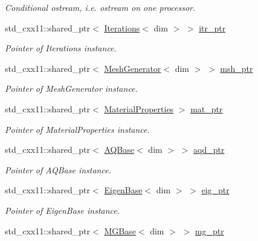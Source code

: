 \begin{DoxyCompactItemize}
\begin{DoxyCompactList}\small\item\em Conditional ostream, i.\+e. ostream on one processor. \end{DoxyCompactList}\item 
std\+\_\+cxx11\+::shared\+\_\+ptr$<$ \hyperlink{class_iterations}{Iterations}$<$ dim $>$ $>$ \hyperlink{class_bart_driver_ae07e7a592dd255d69685f17d98a2ecc6}{itr\+\_\+ptr}
\begin{DoxyCompactList}\small\item\em Pointer of Iterations instance. \end{DoxyCompactList}\item 
std\+\_\+cxx11\+::shared\+\_\+ptr$<$ \hyperlink{class_mesh_generator}{Mesh\+Generator}$<$ dim $>$ $>$ \hyperlink{class_bart_driver_a976c3ba1c98180dced85019dfd56e225}{msh\+\_\+ptr}
\begin{DoxyCompactList}\small\item\em Pointer of Mesh\+Generator instance. \end{DoxyCompactList}\item 
std\+\_\+cxx11\+::shared\+\_\+ptr$<$ \hyperlink{class_material_properties}{Material\+Properties} $>$ \hyperlink{class_bart_driver_aef9abac579c212463a6790a0e39e6429}{mat\+\_\+ptr}
\begin{DoxyCompactList}\small\item\em Pointer of Material\+Properties instance. \end{DoxyCompactList}\item 
std\+\_\+cxx11\+::shared\+\_\+ptr$<$ \hyperlink{class_a_q_base}{A\+Q\+Base}$<$ dim $>$ $>$ \hyperlink{class_bart_driver_a818149e4acfe5a7108ef42938650ff11}{aqd\+\_\+ptr}
\begin{DoxyCompactList}\small\item\em Pointer of A\+Q\+Base instance. \end{DoxyCompactList}\item 
std\+\_\+cxx11\+::shared\+\_\+ptr$<$ \hyperlink{class_eigen_base}{Eigen\+Base}$<$ dim $>$ $>$ \hyperlink{class_bart_driver_a90adc0f013f07a10c5d423e3506bd589}{eig\+\_\+ptr}
\begin{DoxyCompactList}\small\item\em Pointer of Eigen\+Base instance. \end{DoxyCompactList}\item 
std\+\_\+cxx11\+::shared\+\_\+ptr$<$ \hyperlink{class_m_g_base}{M\+G\+Base}$<$ dim $>$ $>$ \hyperlink{class_bart_driver_a1ae1a91d9a049ba4354c71f6ad689d74}{mg\+\_\+ptr}

\end{DoxyCompactItemize}
